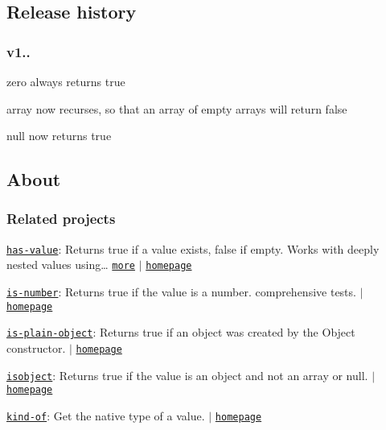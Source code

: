 \subsection*{Release history}

\subsubsection*{v1..}


\begin{DoxyItemize}
\item {\ttfamily zero} always returns true
\item {\ttfamily array} now recurses, so that an array of empty arrays will return {\ttfamily false}
\item {\ttfamily null} now returns true
\end{DoxyItemize}

\subsection*{About}

\subsubsection*{Related projects}


\begin{DoxyItemize}
\item \href{https://www.npmjs.com/package/has-value}{\tt has-\/value}\+: Returns true if a value exists, false if empty. Works with deeply nested values using… \href{https://github.com/jonschlinkert/has-value}{\tt more} $\vert$ \href{https://github.com/jonschlinkert/has-value}{\tt homepage}
\item \href{https://www.npmjs.com/package/is-number}{\tt is-\/number}\+: Returns true if the value is a number. comprehensive tests. $\vert$ \href{https://github.com/jonschlinkert/is-number}{\tt homepage}
\item \href{https://www.npmjs.com/package/is-plain-object}{\tt is-\/plain-\/object}\+: Returns true if an object was created by the {\ttfamily Object} constructor. $\vert$ \href{https://github.com/jonschlinkert/is-plain-object}{\tt homepage}
\item \href{https://www.npmjs.com/package/isobject}{\tt isobject}\+: Returns true if the value is an object and not an array or null. $\vert$ \href{https://github.com/jonschlinkert/isobject}{\tt homepage}
\item \href{https://www.npmjs.com/package/kind-of}{\tt kind-\/of}\+: Get the native type of a value. $\vert$ \href{https://github.com/jonschlinkert/kind-of}{\tt homepage}
\end{DoxyItemize}

